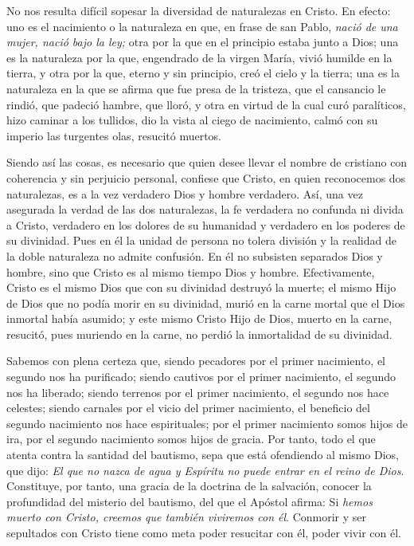 						\begin{body}
							No nos resulta difícil sopesar la diversidad de naturalezas en Cristo. En efecto: uno es el nacimiento o la naturaleza en que, en frase de san Pablo, \emph{nació de una mujer, nació bajo la ley;} otra por la que en el principio estaba junto a Dios; una es la naturaleza por la que, engendrado de la virgen María, vivió humilde en la tierra, y otra por la que, eterno y sin principio, creó el cielo y la tierra; una es la naturaleza en la que se afirma que fue presa de la tristeza, que el cansancio le rindió, que padeció hambre, que lloró, y otra en virtud de la cual curó paralíticos, hizo caminar a los tullidos, dio la vista al ciego de nacimiento, calmó con su imperio las turgentes olas, resucitó muertos.
							
							Siendo así las cosas, es necesario que quien desee llevar el nombre de cristiano con coherencia y sin perjuicio personal, confiese que Cristo, en quien reconocemos dos naturalezas, es a la vez verdadero Dios y hombre verdadero. Así, una vez asegurada la verdad de las dos naturalezas, la fe verdadera no confunda ni divida a Cristo, verdadero en los dolores de su humanidad y verdadero en los poderes de su divinidad. Pues en él la unidad de persona no tolera división y la realidad de la doble naturaleza no admite confusión. En él no subsisten separados Dios y hombre, sino que Cristo es al mismo tiempo Dios y hombre. Efectivamente, Cristo es el mismo Dios que con su divinidad destruyó la muerte; el mismo Hijo de Dios que no podía morir en su divinidad, murió en la carne mortal que el Dios inmortal había asumido; y este mismo Cristo Hijo de Dios, muerto en la carne, resucitó, pues muriendo en la carne, no perdió la inmortalidad de su divinidad.
							
							Sabemos con plena certeza que, siendo pecadores por el primer nacimiento, el segundo nos ha purificado; siendo cautivos por el primer nacimiento, el segundo nos ha liberado; siendo terrenos por el primer nacimiento, el segundo nos hace celestes; siendo carnales por el vicio del primer nacimiento, el beneficio del segundo nacimiento nos hace espirituales; por el primer nacimiento somos hijos de ira, por el segundo nacimiento somos hijos de gracia. Por tanto, todo el que atenta contra la santidad del bautismo, sepa que está ofendiendo al mismo Dios, que dijo: \emph{El que no nazca de agua y Espíritu no puede entrar en el reino de Dios}. Constituye, por tanto, una gracia de la doctrina de la salvación, conocer la profundidad del misterio del bautismo, del que el Apóstol afirma: Si \emph{hemos muerto con Cristo, creemos que también viviremos con él}. Conmorir y ser sepultados con Cristo tiene como meta poder resucitar con él, poder vivir con él.
						\end{body}
					
